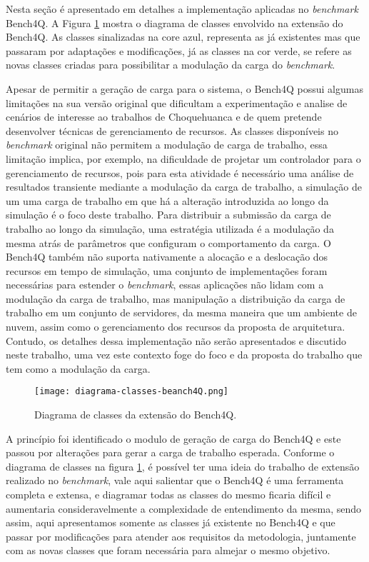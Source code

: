 Nesta seção é apresentado em detalhes a implementação aplicadas no \textit{benchmark} Bench4Q. A Figura \ref{fig:diagrama-classes} mostra o diagrama de classes envolvido na extensão do Bench4Q. As classes sinalizadas na core azul, representa as já existentes mas que passaram por adaptações e modificações, já as classes na cor verde, se refere as novas classes criadas para possibilitar a modulação da carga do \textit{benchmark}.

Apesar de permitir a geração de carga para o sistema, o Bench4Q possui algumas limitações na sua versão original que dificultam a experimentação e analise de cenários de interesse ao trabalhos de Choquehuanca e \cite{Lourenco2015} de quem pretende desenvolver técnicas de gerenciamento de recursos.
As classes disponíveis no \textit{benchmark} original não permitem a modulação de carga de trabalho, essa limitação implica, por exemplo, na dificuldade de projetar um controlador para o gerenciamento de recursos, pois para esta atividade é necessário uma análise de resultados transiente mediante a modulação da carga de trabalho, a simulação de um uma carga de trabalho em que há a alteração introduzida ao longo da simulação é o foco deste trabalho.
Para distribuir a submissão da carga de trabalho ao longo da simulação, uma estratégia utilizada é a modulação da mesma atrás de parâmetros que configuram o comportamento da carga. O Bench4Q também não suporta nativamente a alocação e a deslocação dos recursos em tempo de simulação, uma conjunto de implementações foram necessárias para estender o \textit{benchmark}, essas aplicações não lidam com a modulação da carga de trabalho, mas manipulação a distribuição da carga de trabalho em um conjunto de servidores, da mesma maneira que um ambiente de nuvem, assim como o gerenciamento dos recursos da proposta de arquitetura. Contudo, os detalhes dessa implementação não serão apresentados e discutido neste trabalho, uma vez este contexto foge do foco e da proposta do trabalho que tem como a modulação da carga.

\begin{figure}[htb]
	\centering
	\texttt{[image: diagrama-classes-beanch4Q.png]}	
	\caption{Diagrama de classes da extensão do Bench4Q.}
	\label{fig:diagrama-classes}
	\fautor
\end{figure}


A princípio foi identificado o modulo de geração de carga do Bench4Q e este passou por alterações para gerar a carga de trabalho esperada. Conforme o diagrama de classes na figura \ref{fig:diagrama-classes}, é possível ter uma ideia do trabalho de extensão realizado no \textit{benchmark}, vale aqui salientar que o Bench4Q é uma ferramenta completa e extensa, e diagramar todas as classes do mesmo ficaria difícil e aumentaria consideravelmente a complexidade de entendimento da mesma, sendo assim, aqui apresentamos somente as classes já existente no Bench4Q e que passar por modificações para atender aos requisitos da metodologia, juntamente com as novas classes que foram necessária para almejar o mesmo objetivo.

